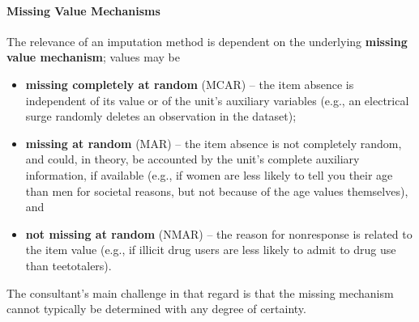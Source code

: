 \paragraph{Missing Value Mechanisms} The relevance of an imputation method is dependent on the underlying \textbf{missing value mechanism}; values may be 
\begin{itemize}[noitemsep]
\item \textbf{missing completely at random} (MCAR) -- the item absence is independent of its value or of the unit's auxiliary variables (e.g., an electrical surge randomly deletes an observation in the dataset); 
\item \textbf{missing at random} (MAR) -- the item absence is not completely random, and could, in theory, be accounted by the unit's complete auxiliary information, if available (e.g., if women are less likely to tell you their age than men for societal reasons, but not because of the age values  themselves), and 
\item \textbf{not missing at random} (NMAR) -- the reason for nonresponse is related to the item value (e.g., if illicit drug users are less likely to admit to drug use than teetotalers).
\end{itemize}
The consultant's main challenge in that regard is that the missing mechanism cannot typically be determined with any degree of certainty.

